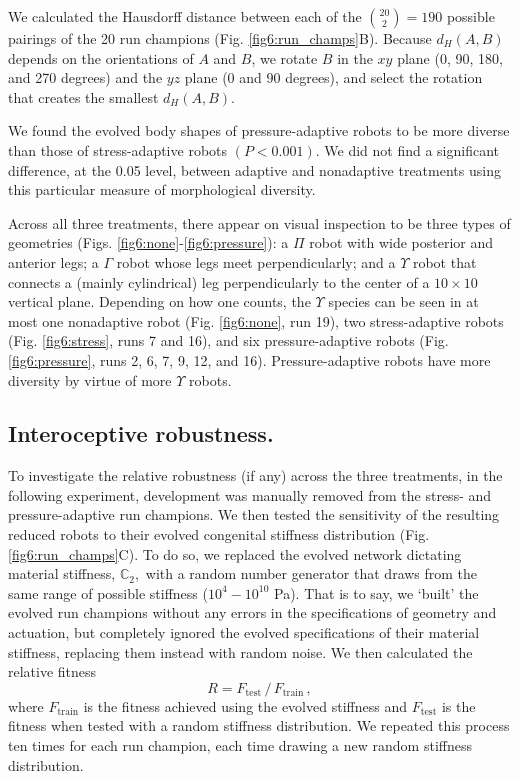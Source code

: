 We calculated the Hausdorff distance between each of the $\binom{20}{2}=190$ possible pairings of the 20 run champions (Fig. \ref{fig6:run_champs}B).
Because $d_H(A,B)$ depends on the orientations of $A$ and $B$, we rotate $B$ in the $xy$ plane (0, 90, 180, and 270 degrees) and the $yz$ plane (0 and 90 degrees), and select the rotation that creates the smallest $d_H(A,B)$.

We found the evolved body shapes of pressure-adaptive robots to be more diverse than those of stress-adaptive robots $(P<0.001)$.
We did not find a significant difference, at the 0.05 level, between adaptive and nonadaptive treatments using this particular measure of morphological diversity.

Across all three treatments,
there appear on visual inspection to be three types of geometries (Figs. \ref{fig6:none}-\ref{fig6:pressure}): a $\Pi$ robot with wide posterior and anterior legs; a $\Gamma$ robot whose legs meet perpendicularly; and a $\Upsilon$ robot that connects a (mainly cylindrical) leg perpendicularly to the center of a $10\times10$ vertical plane.
Depending on how one counts, the $\Upsilon$ species can be seen in at most one nonadaptive robot (Fig. \ref{fig6:none}, run 19), two stress-adaptive robots (Fig. \ref{fig6:stress}, runs 7 and 16), and six pressure-adaptive robots (Fig. \ref{fig6:pressure}, runs 2, 6, 7, 9, 12, and 16).
Pressure-adaptive robots have more diversity by virtue of more $\Upsilon$ robots.


\subsection*{Interoceptive robustness.}

To investigate the relative robustness (if any) across the three treatments,
in the following experiment, development was manually removed from the stress- and pressure-adaptive run champions.
We then tested the sensitivity of the resulting reduced robots to their evolved congenital stiffness distribution (Fig. \ref{fig6:run_champs}C).
To do so, we replaced the evolved network dictating material stiffness, $\mathbb{C}_2,$ with a random number generator that draws from the same range of possible stiffness ($10^4 - 10^{10}$ Pa).
That is to say, we `built' the evolved run champions without any errors in the specifications of geometry and actuation, but completely ignored the evolved specifications of their material stiffness, replacing them instead with random noise.
We then calculated the relative fitness
\begin{equation}
\label{eq:robustness}
R = F_{\text{test}}\,/\,F_{\text{train}} \, ,
\end{equation}
where $F_{\text{train}}$ is the fitness achieved using the evolved stiffness and $F_{\text{test}}$ is the fitness when tested with a random stiffness distribution.
We repeated this process ten times for each run champion, each time drawing a new random stiffness distribution.


